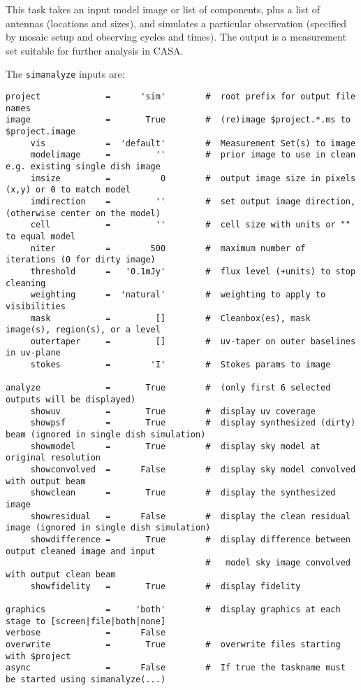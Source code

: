 This task takes an input model image or list of components, plus a
list of antennas (locations and sizes), and simulates a particular
observation (specified by mosaic setup and observing cycles and
times).  The output is a measurement set suitable for further analysis in CASA.

The {\tt simanalyze} inputs are:
\small
\begin{verbatim}
project             =      'sim'        #  root prefix for output file names
image               =       True        #  (re)image $project.*.ms to $project.image
     vis            =  'default'        #  Measurement Set(s) to image
     modelimage     =         ''        #  prior image to use in clean e.g. existing single dish image
     imsize         =          0        #  output image size in pixels (x,y) or 0 to match model
     imdirection    =         ''        #  set output image direction, (otherwise center on the model)
     cell           =         ''        #  cell size with units or "" to equal model
     niter          =        500        #  maximum number of iterations (0 for dirty image)
     threshold      =   '0.1mJy'        #  flux level (+units) to stop cleaning
     weighting      =  'natural'        #  weighting to apply to visibilities
     mask           =         []        #  Cleanbox(es), mask image(s), region(s), or a level
     outertaper     =         []        #  uv-taper on outer baselines in uv-plane
     stokes         =        'I'        #  Stokes params to image

analyze             =       True        #  (only first 6 selected outputs will be displayed)
     showuv         =       True        #  display uv coverage
     showpsf        =       True        #  display synthesized (dirty) beam (ignored in single dish simulation)
     showmodel      =       True        #  display sky model at original resolution
     showconvolved  =      False        #  display sky model convolved with output beam
     showclean      =       True        #  display the synthesized image
     showresidual   =      False        #  display the clean residual image (ignored in single dish simulation)
     showdifference =       True        #  display difference between output cleaned image and input
                                        #   model sky image convolved with output clean beam
     showfidelity   =       True        #  display fidelity

graphics            =     'both'        #  display graphics at each stage to [screen|file|both|none]
verbose             =      False        
overwrite           =       True        #  overwrite files starting with $project
async               =      False        #  If true the taskname must be started using simanalyze(...)
\end{verbatim}
\normalsize

